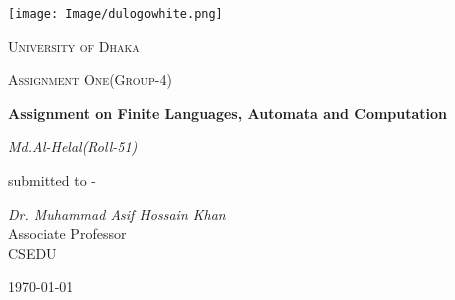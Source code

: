 \documentclass[12pt,a4paper]{report}
\begin{document}
\begin{titlepage}
\centering
\texttt{[image: Image/dulogowhite.png]}\\
{\scshape\LARGE University of Dhaka \par}
\vspace{1cm}
{\scshape\Large Assignment One(Group-4)\par}
\vspace{1.5cm}
{\huge\bfseries Assignment on Finite Languages, Automata and Computation\par}
\vspace{2cm}
{\Large\itshape Md.Al-Helal(Roll-51)\par}
\vfill
submitted to -\par
{\itshape Dr. Muhammad Asif Hossain Khan}\\ Associate Professor\\CSEDU
\vfill
{\large \today\par}
\end{titlepage}
\end{document}
